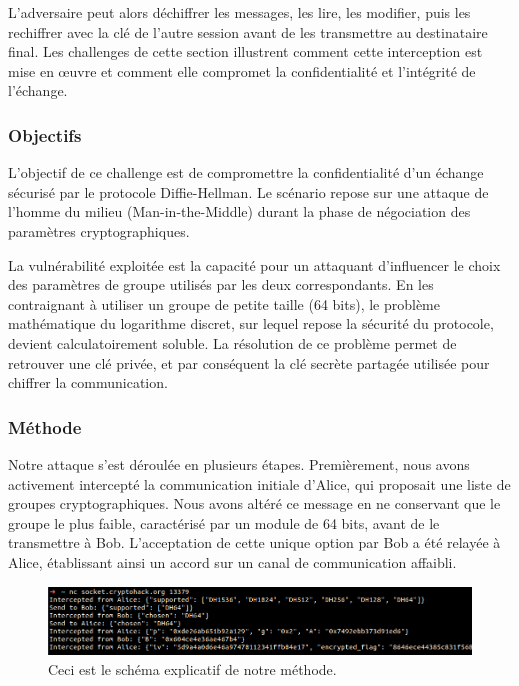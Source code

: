     L'adversaire peut alors déchiffrer les messages, les lire, les modifier, puis
    les rechiffrer avec la clé de l'autre session avant de les transmettre au
    destinataire final. Les challenges de cette section illustrent comment
    cette interception est mise en œuvre et comment elle compromet la
    confidentialité et l'intégrité de l'échange.

    \subsubsection{Objectifs}
    L'objectif de ce challenge est de compromettre la confidentialité d'un
    échange sécurisé par le protocole Diffie-Hellman. Le scénario repose sur
    une attaque de l'homme du milieu (Man-in-the-Middle) durant la phase de
    négociation des paramètres cryptographiques.

    La vulnérabilité exploitée est la capacité pour un attaquant d'influencer
    le choix des paramètres de groupe utilisés par les deux correspondants. En
    les contraignant à utiliser un groupe de petite taille (64 bits), le
    problème mathématique du logarithme discret, sur lequel repose la sécurité
    du protocole, devient calculatoirement soluble. La résolution de ce
    problème permet de retrouver une clé privée, et par conséquent la clé
    secrète partagée utilisée pour chiffrer la communication.

    \subsubsection{Méthode}
    Notre attaque s'est déroulée en plusieurs étapes. Premièrement, nous avons
    activement intercepté la communication initiale d'Alice, qui proposait une
    liste de groupes cryptographiques. Nous avons altéré ce message en ne
    conservant que le groupe le plus faible, caractérisé par un module de 64
    bits, avant de le transmettre à Bob. L'acceptation de cette unique option
    par Bob a été relayée à Alice, établissant ainsi un accord sur un canal de
    communication affaibli.

        \begin{figure}[H]
            \centering
            \includegraphics[width=0.9\linewidth]{Images/DiffieHellman/capture_mitm.png}

            \caption{Ceci est le schéma explicatif de notre méthode.}

            \label{fig:mitmChallenge}
        \end{figure}

